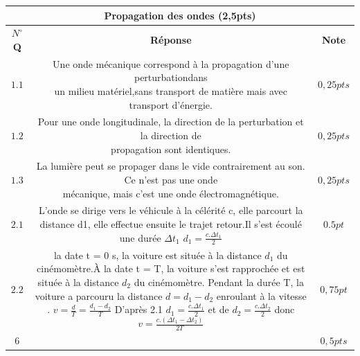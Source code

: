 \documentclass[12pt]{article}
\begin{document}
\begin{center}
	 \begin{tabular}{|c||c||c|}
	\hline
		 \multicolumn{3}{||c||}{\bf{   \hfill  Propagation des ondes \hfill (2,5pts)} }\\
		 \hline
\hline
	\textbf{$N^{\circ}$Q } & \textbf{Réponse } & \textbf{Note }\\
	\hline
	$1.1$ &
	\makecell[l]{Une  onde  mécanique correspond  à  la  propagation  d’une perturbationdans  \\un  milieu matériel,sans transport de matière mais avec transport d’énergie.
 }
	& $0,25pts$\\\hline
	 $1.2$ &
	 \makecell{
Pour  une  onde  longitudinale,  la  direction  de  la  perturbation  et  la  direction  de  \\propagation sont identiques.
	 }
	& $0,25pts$\\\hline  
	 $1.3$ &
	 \makecell{
La lumière peut se propager dans le vide contrairement au son. Ce n’est pas une onde \\mécanique, mais c’est une onde électromagnétique.
	 }
	& $0,25pts$\\\hline  
	 $2.1$ &
		 \makecell{
			 L’onde se dirige vers le véhicule à la célérité c, elle parcourt la distance \\d1,  elle  effectue ensuite le trajet retour.Il s’est écoulé une durée $\Delta{t_1}$
			 \\$d_1=\frac{c.\Delta{t_1}}{2}$}
	& $0.5pt$\\\hline  
	 $2.2$ &
	 \makecell{
 la date t = 0 s, la voiture est située à la distance $d_1$ du cinémomètre.À la date t = T,\\la voiture s’est rapprochée et est située à la distance $d_2$ du cinémomètre.
\\Pendant la durée T, la voiture a parcouru la distance $d = d_1 - d_2$ enroulant à la vitesse .
\\$v = \frac{d}{T} = \frac{d_1 - d_2}{T}$
 \\D’après 2.1 $d_1 = \frac{c.\Delta{t_1}}{2}$  et de $d_2 = \frac{c.\Delta{t_2}}{2}$ 
 \\ donc $v = \frac{c.(\Delta{t_1} - \Delta{t_2})}{2T}$
}
	& $0,75pt$\\\hline  
	  
	 $6$ &
	  \makecell{
		  $(\Delta{t_1} - \Delta{t_2}) = \frac{v.2T}{c} = 0,33ns$
	  }
	& $0,5pts$\\\hline  


\end{tabular}
\end{center}
\end{document}
